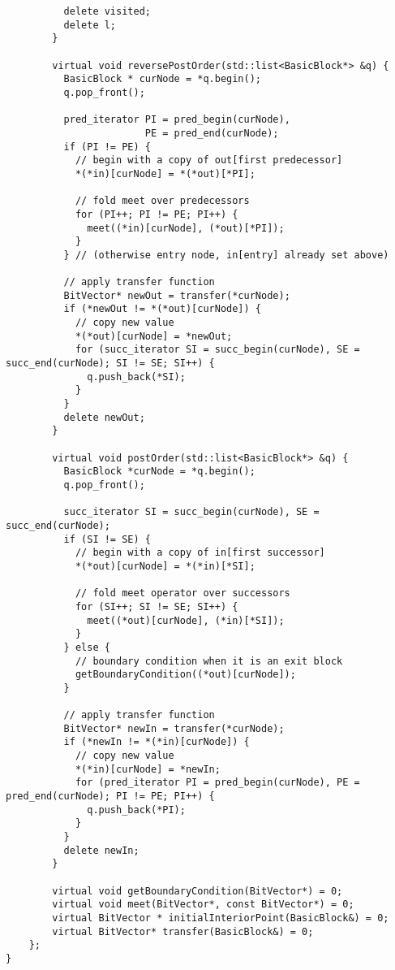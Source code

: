 \documentclass[12pt]{article}
\begin{document}
\begin{verbatim}
          delete visited;
          delete l;
        }

        virtual void reversePostOrder(std::list<BasicBlock*> &q) {
          BasicBlock * curNode = *q.begin();
          q.pop_front();

          pred_iterator PI = pred_begin(curNode), 
                        PE = pred_end(curNode);
          if (PI != PE) {
            // begin with a copy of out[first predecessor]
            *(*in)[curNode] = *(*out)[*PI];  

            // fold meet over predecessors
            for (PI++; PI != PE; PI++) {
              meet((*in)[curNode], (*out)[*PI]);
            }
          } // (otherwise entry node, in[entry] already set above)

          // apply transfer function
          BitVector* newOut = transfer(*curNode);
          if (*newOut != *(*out)[curNode]) {
            // copy new value
            *(*out)[curNode] = *newOut;
            for (succ_iterator SI = succ_begin(curNode), SE = succ_end(curNode); SI != SE; SI++) {
              q.push_back(*SI);
            }
          }
          delete newOut;
        }
        
        virtual void postOrder(std::list<BasicBlock*> &q) {
          BasicBlock *curNode = *q.begin();
          q.pop_front();
        	
          succ_iterator SI = succ_begin(curNode), SE = succ_end(curNode);
          if (SI != SE) {
            // begin with a copy of in[first successor]
            *(*out)[curNode] = *(*in)[*SI];

            // fold meet operator over successors
            for (SI++; SI != SE; SI++) {
              meet((*out)[curNode], (*in)[*SI]);
            }
          } else {
            // boundary condition when it is an exit block
            getBoundaryCondition((*out)[curNode]);
          }

          // apply transfer function
          BitVector* newIn = transfer(*curNode);
          if (*newIn != *(*in)[curNode]) {
            // copy new value
            *(*in)[curNode] = *newIn;
            for (pred_iterator PI = pred_begin(curNode), PE = pred_end(curNode); PI != PE; PI++) {
              q.push_back(*PI);
            }
          }
          delete newIn;
        }
        
        virtual void getBoundaryCondition(BitVector*) = 0;
        virtual void meet(BitVector*, const BitVector*) = 0;
        virtual BitVector * initialInteriorPoint(BasicBlock&) = 0;
        virtual BitVector* transfer(BasicBlock&) = 0;
    };
}

\end{verbatim}
\end{document}
